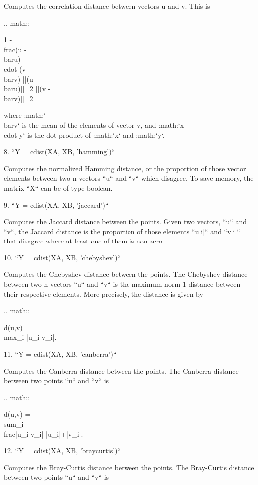 \begin{DoxyVerb}
   Computes the correlation distance between vectors u and v. This is

   .. math::

      1 - \\frac{(u - \\bar{u}) \\cdot (v - \\bar{v})}
               {{||(u - \\bar{u})||}_2 {||(v - \\bar{v})||}_2}

   where :math:`\\bar{v}` is the mean of the elements of vector v,
   and :math:`x \\cdot y` is the dot product of :math:`x` and :math:`y`.


8. ``Y = cdist(XA, XB, 'hamming')``

   Computes the normalized Hamming distance, or the proportion of
   those vector elements between two n-vectors ``u`` and ``v``
   which disagree. To save memory, the matrix ``X`` can be of type
   boolean.

9. ``Y = cdist(XA, XB, 'jaccard')``

   Computes the Jaccard distance between the points. Given two
   vectors, ``u`` and ``v``, the Jaccard distance is the
   proportion of those elements ``u[i]`` and ``v[i]`` that
   disagree where at least one of them is non-zero.

10. ``Y = cdist(XA, XB, 'chebyshev')``

   Computes the Chebyshev distance between the points. The
   Chebyshev distance between two n-vectors ``u`` and ``v`` is the
   maximum norm-1 distance between their respective elements. More
   precisely, the distance is given by

   .. math::

      d(u,v) = \\max_i {|u_i-v_i|}.

11. ``Y = cdist(XA, XB, 'canberra')``

   Computes the Canberra distance between the points. The
   Canberra distance between two points ``u`` and ``v`` is

   .. math::

     d(u,v) = \\sum_i \\frac{|u_i-v_i|}
                          {|u_i|+|v_i|}.

12. ``Y = cdist(XA, XB, 'braycurtis')``

   Computes the Bray-Curtis distance between the points. The
   Bray-Curtis distance between two points ``u`` and ``v`` is



\end{DoxyVerb}
